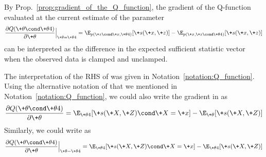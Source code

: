 \documentclass{article} %
\newcommand{\sufficientStatsFunction}{\+s}
\newcommand{\param}{\+\theta}
\begin{document}
\begin{corollary}
By Prop.~\ref{prop:gradient_of_the_Q_function}, the gradient of the Q-function evaluated at the current estimate of the parameter
%
\begin{align}
\frac{\partial Q(\param \cond \param^^t)}{\partial \param} \Bigr|_{\param = \param^^t} =  \E_{p(\+z \cond \+x, \param^^t)}[\sufficientStatsFunction(\+x,\+z)] - 	\E_{p(\+x, \+z \cond \param^^t)}[\sufficientStatsFunction(\+x,\+z)] 
\label{eqn:gradient_of_Q_function_as_difference_in_expected_sufficient_stats_with_clamped_and_unclamped_data}
\end{align}
%
can be interpreted as the difference in the expected sufficient statistic vector when the observed data is clamped and unclamped.
\end{corollary}



\begin{notation}
The interpretation of the RHS of  was given in Notation~\ref{notation:Q_function}.     Using the alternative notation of \citet{miller2011why} that we mentioned in Notation~\ref{notation:Q_function}, we could also write the gradient in  as 
 \begin{align}
 \frac{\partial Q(\param \cond \param^^t)}{\partial \param} =  \E_{\param^^t}[\sufficientStatsFunction(\+X,\+Z) \cond \+X=\+x] - 	\E_{\param}[\sufficientStatsFunction(\+X,\+Z)]
 \label{eqn:gradient_of_Q_function_for_EM_in_jeff_millers_notation}
 \end{align}
 Similarly, we could write  as
 \begin{align}
 \frac{\partial Q(\param \cond \param^^t)}{\partial \param} \Bigr|_{\param = \param^^t} =  \E_{\param^^t}[\sufficientStatsFunction(\+X,\+Z) \cond \+X=\+x] - 	\E_{\param^^t}[\sufficientStatsFunction(\+X,\+Z)]
 \label{eqn:the_gradient_of_the_Q_function_evaluated_at_the_current_parameter_and_using_jeffs_notation}
 \end{align}
\end{notation}
\end{document}
